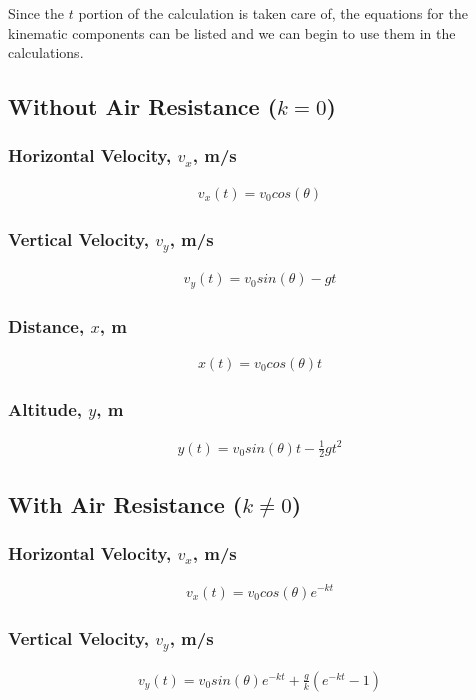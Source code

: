 \documentclass[oneside]{article}
\begin{document}
Since the $t$ portion of the calculation is taken care of, the equations for the  kinematic components can be listed and we can begin to use them in the calculations.

\subsection{Without Air Resistance ($k = 0$)}
\subsubsection{Horizontal Velocity, $v_x$, m/s}
\begin{align}
    v_x(t) = v_0cos(\theta)
\end{align}
\subsubsection{Vertical Velocity, $v_y$, m/s}
\begin{align}
    v_y(t) = v_0sin(\theta) - gt
\end{align}
\subsubsection{Distance, $x$, m}
\begin{align}
    x(t) = v_0cos(\theta)t
\end{align}
\subsubsection{Altitude, $y$, m}
\begin{align}
    y(t) = v_0sin(\theta)t - \frac{1}{2}gt^2
\end{align}

\subsection{With Air Resistance ($k \neq 0$)}
\subsubsection{Horizontal Velocity, $v_x$, m/s}
    \begin{align}
        v_x(t) = v_0cos(\theta)e^{-kt}
    \end{align}
\subsubsection{Vertical Velocity, $v_y$, m/s}
    \begin{align}
        v_y(t) = v_0sin(\theta)e^{-kt} + \frac{g}{k}(e^{-kt} -1)
    \end{align}
\end{document}
